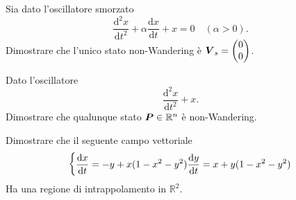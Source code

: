 \begin{ex}[]
    Sia dato l'oscillatore smorzato 
    \[
	\frac{\text{d} ^2x}{\text{d} t^2} + \alpha\frac{\text{d} x}{\text{d} t} + x = 0 \quad  (\alpha >0) 
    .\] 
    Dimostrare che l'unico stato non-Wandering è $\boldsymbol{V}_s = \begin{pmatrix} 0 \\ 0\end{pmatrix}$.
\end{ex}
\noindent
\begin{ex}[]
    Dato l'oscillatore
    \[
        \frac{\text{d} ^2x}{\text{d} t^2} + x
    .\] 
    Dimostrare che qualunque stato $\boldsymbol{P}\in \mathbb{R}^n$ è non-Wandering.
\end{ex}
\noindent
\begin{ex}[]
    Dimostrare che il seguente campo vettoriale 
    \[
    \begin{dcases}
	 \frac{\text{d} x}{\text{d} t} = -y + x (1-x^2-y^2) 
	 \frac{\text{d} y}{\text{d} t} = x + y(1-x^2-y^2)
    \end{dcases}
    \]
    Ha una regione di intrappolamento in $\mathbb{R}^2$.
\end{ex}
\noindent
